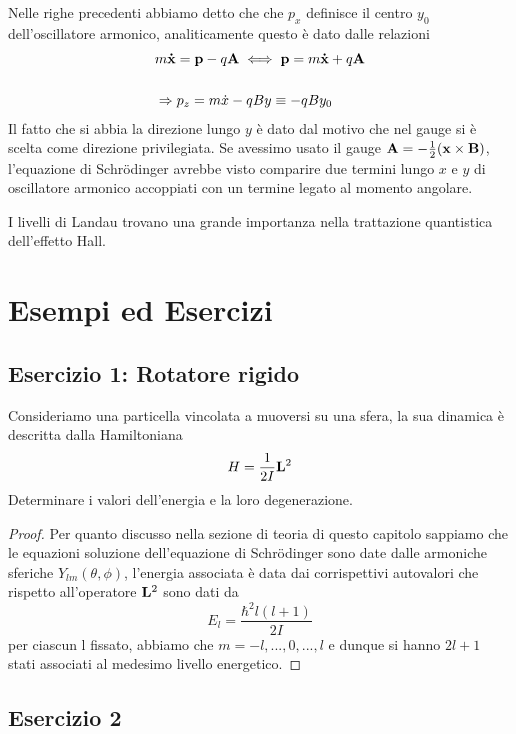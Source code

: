 Nelle righe precedenti abbiamo detto che che $p_x$ definisce il centro $y_0$ dell'oscillatore armonico, analiticamente questo \`e dato dalle relazioni
\begin{align*}
	&m\bold{\dot{x}} = \bold{p}-q\bold{A} \iff \bold{p} = m\bold{\dot{x}} + q \bold{A} \\[0.5cm]&\Rightarrow p_z = m\dot{x} - qBy \equiv  -qBy_0
\end{align*}
Il fatto che si abbia la direzione lungo $y$ \`e dato dal motivo che nel gauge si \`e scelta come direzione privilegiata. Se avessimo usato il gauge $\bold{A} = - \frac{1}{2}(\bold{x} \times \bold{B})$, l'equazione di Schr\"odinger avrebbe visto comparire due termini lungo $x$ e $y$ di oscillatore armonico accoppiati con un termine legato al momento angolare.

\noindent I livelli di Landau trovano una grande importanza nella trattazione quantistica dell'effetto Hall.

\section{Esempi ed Esercizi}

\subsection{Esercizio 1: Rotatore rigido}

Consideriamo una particella vincolata a muoversi su una sfera, la sua dinamica \`e descritta dalla Hamiltoniana 
\begin{equation*}
	H = \frac{1}{2I} \bold{L}^2
\end{equation*}
Determinare i valori dell'energia e la loro degenerazione.
\begin{proof}
Per quanto discusso nella sezione di teoria di questo capitolo sappiamo che le equazioni soluzione dell'equazione di Schr\"odinger sono date dalle armoniche sferiche $Y_{lm}(\theta, \phi)$, l'energia associata \`e data dai corrispettivi autovalori che rispetto all'operatore $\bold{L}^2$ sono dati da 
\begin{equation*}
	E_{l} = \frac{\hbar^2 l(l+1)}{2I}
\end{equation*}
per ciascun l fissato, abbiamo che $m = -l,...,0,...,l$ e dunque si hanno $2l+1$ stati associati al medesimo livello energetico.

\end{proof}

\subsection{Esercizio 2}

